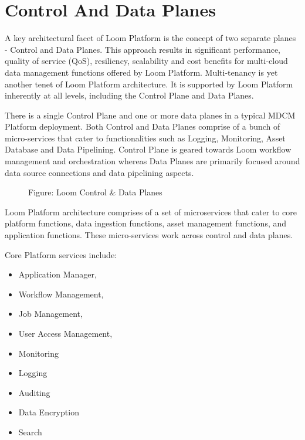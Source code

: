 \documentclass[letterpaper,10pt,english]{sphinxmanual}
\begin{document}
\section{Control And Data Planes}
\label{\detokenize{mcdmp_concepts:control-and-data-planes}}\label{\detokenize{mcdmp_concepts:def-term-planes}}
A key architectural facet of Loom Platform is the concept of two separate planes - Control and Data Planes. This approach results in significant performance, quality of service (QoS), resiliency, scalability and cost benefits for multi-cloud data management functions offered by Loom Platform.  Multi-tenancy is yet another tenet of Loom Platform architecture. It is supported by Loom Platform inherently at all levels, including the Control Plane and Data Planes.

There is a single Control Plane and one or more data planes in a typical MDCM Platform deployment. Both Control and Data Planes comprise of a bunch of micro-services that cater to functionalities such as Logging, Monitoring, Asset Database and Data Pipelining.  Control Plane is geared towards Loom workflow management and orchestration whereas Data Planes are primarily focused around data source connections and data pipelining aspects.

\begin{figure}[htbp]
\centering
\capstart

\noindent{}
\caption{Figure: Loom Control \& Data Planes}\label{\detokenize{mcdmp_concepts:id6}}\end{figure}

Loom Platform architecture comprises of a set of microservices that cater to core platform functions, data ingestion functions, asset management functions, and application functions. These micro-services work across control and data planes.

Core Platform services include:
\begin{itemize}
\item {} 
Application Manager,

\item {} 
Workflow Management,

\item {} 
Job Management,

\item {} 
User Access Management,

\item {} 
Monitoring

\item {} 
Logging

\item {} 
Auditing

\item {} 
Data Encryption

\item {} 
Search

\end{itemize}
\end{document}
